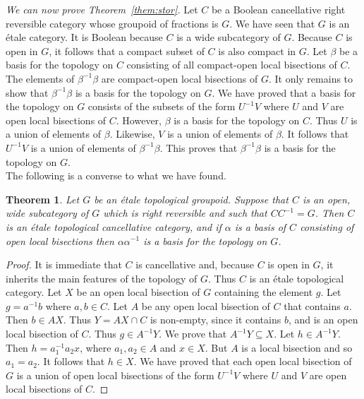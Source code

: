 \documentclass[a4paper]{amsart}
\newtheorem{theorem}{Theorem}[section]
\begin{document}
{\em We can now prove Theorem~\ref{them:stor}.}
Let $C$ be a Boolean cancellative right reversible category whose groupoid of fractions is $G$. 
We have seen that $G$ is an \'etale category.
It is Boolean because $C$ is a wide subcategory of $G$.
Because $C$ is open in $G$, it follows that a compact subset of $C$ is also compact in $G$.
Let $\beta$ be a basis for the topology on $C$ consisting of all compact-open local bisections of $C$.
The elements of $\beta^{-1}\beta$ are compact-open local bisections of $G$.
It only remains to show that $\beta^{-1}\beta$ is a basis for the topology on $G$.
We have proved that a basis for the topology on $G$ consists of the subsets of the form
$U^{-1}V$ where $U$ and $V$ are open local bisections of $C$.
However, $\beta$ is a basis for the topology on $C$.
Thus $U$ is a union of elements of $\beta$.
Likewise, $V$ is a union of elements of $\beta$.
It follows that $U^{-1}V$ is a union of elements of $\beta^{-1}\beta$.
This proves that $\beta^{-1}\beta$ is a basis for the topology on $G$. \\

The following is a converse to what we have found. 


\begin{theorem}\label{them:twelve} Let $G$ be an \'etale topological groupoid.
Suppose that $C$ is an open, wide subcategory of $G$ which is right reversible 
and such that $CC^{-1} = G$.
Then $C$ is an \'etale topological cancellative category,
and if $\alpha$ is a basis of $C$ consisting of open local bisections
then $\alpha \alpha^{-1}$ is a basis for the topology on $G$.
\end{theorem}
\begin{proof} It is immediate that $C$ is cancellative and, because $C$ is open in $G$,
it inherits the main features of the topology of $G$.
Thus $C$ is an \'etale topological category.
Let $X$ be an open local bisection of $G$ containing the element $g$.
Let $g = a^{-1}b$ where $a,b \in C$.
Let $A$ be any open local bisection of $C$ that contains $a$.
Then $b \in AX$.
Thus $Y = AX \cap C$ is non-empty, since it contains $b$, and is an open local bisection of $C$.
Thus $g \in A^{-1}Y$.
We prove that $A^{-1}Y \subseteq X$.
Let $h \in A^{-1}Y$.
Then $h = a_{1}^{-1}a_{2}x$, where $a_{1},a_{2} \in A$ and $x \in X$.
But $A$ is a local bisection and so $a_{1} = a_{2}$.
It follows that $h \in X$.
We have proved that each open local bisection of $G$ is a union of open local
bisections of the form $U^{-1}V$ where $U$ and $V$ are open local bisections of $C$.
\end{proof}
\end{document}
